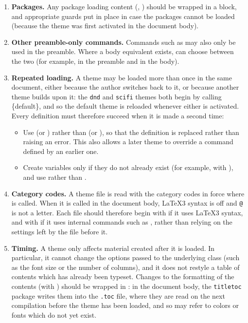 			\begin{enumerate}
				\item \textbf{Packages.} Any package loading content (, ) should be wrapped in a  block, and appropriate guards put in place in case the packages cannot be loaded (because the theme was first activated in the document body).
				\item \textbf{Other preamble-only commands.} Commands such as  may also only be used in the preamble. Where a body equivalent exists,  can choose between the two (for example,  in the preamble and  in the body).
				\item \textbf{Repeated loading.} A theme may be loaded more than once in the same document, either because the author switches back to it, or because another theme builds upon it: the \texttt{dnd} and \texttt{scifi} themes both begin by calling \{default\}, and so the default theme is reloaded whenever either is activated. Every definition must therefore succeed when it is made a second time:
				      \begin{itemize}
					      \item Use  (or ) rather than  (or ), so that the definition is replaced rather than raising an error. This also allows a later theme to override a command defined by an earlier one.
					      \item Create variables only if they do not already exist (for example, with ), and use  rather than .
				      \end{itemize}
				\item \textbf{Category codes.} A theme file is read with the category codes in force where  is called. When it is called in the document body, \LaTeX{}3 syntax is off and \texttt{@} is not a letter. Each file should therefore begin with  if it uses \LaTeX{}3 syntax, and with  if it uses internal commands such as , rather than relying on the settings left by the file before it.
				\item \textbf{Timing.} A theme only affects material created after it is loaded. In particular, it cannot change the options passed to the underlying class (such as the font size or the number of columns), and it does not restyle a table of contents which has already been typeset. Changes to the formatting of the contents (with ) should be wrapped in : in the document body, the \texttt{titletoc} package writes them into the \texttt{.toc} file, where they are read on the next compilation before the theme has been loaded, and so may refer to colors or fonts which do not yet exist.
			\end{enumerate}

